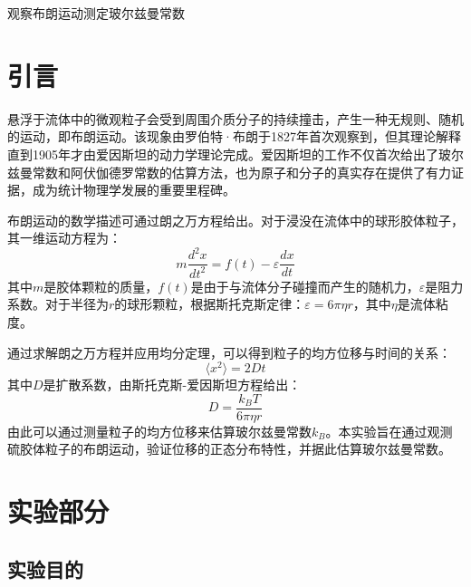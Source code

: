 \documentclass[a4paper]{article}
\newcommand{\zihaoSan}{\fontsize{16pt}{24pt}\selectfont}
\newcommand{\zihaoWu}{\fontsize{10.5pt}{16pt}\selectfont}
\begin{document}
\zihaoWu

\begin{center}
	{\zihaoSan\heiti 观察布朗运动测定玻尔兹曼常数}
\end{center}

\vspace{6pt}

\section{引言}
\vspace{-0.5em}

悬浮于流体中的微观粒子会受到周围介质分子的持续撞击，产生一种无规则、随机的运动，即布朗运动。该现象由罗伯特·布朗于1827年首次观察到，但其理论解释直到1905年才由爱因斯坦的动力学理论完成。爱因斯坦的工作不仅首次给出了玻尔兹曼常数和阿伏伽德罗常数的估算方法，也为原子和分子的真实存在提供了有力证据，成为统计物理学发展的重要里程碑。

布朗运动的数学描述可通过朗之万方程给出。对于浸没在流体中的球形胶体粒子，其一维运动方程为：
\begin{equation}
	m\frac{d^2x}{dt^2} = f(t) - \varepsilon\frac{dx}{dt}
\end{equation}
其中$m$是胶体颗粒的质量，$f(t)$是由于与流体分子碰撞而产生的随机力，$\varepsilon$是阻力系数。对于半径为$r$的球形颗粒，根据斯托克斯定律：$\varepsilon = 6\pi\eta r$，其中$\eta$是流体粘度。

通过求解朗之万方程并应用均分定理，可以得到粒子的均方位移与时间的关系：
\begin{equation}
	\langle x^2 \rangle = 2Dt
\end{equation}
其中$D$是扩散系数，由斯托克斯-爱因斯坦方程给出：
\begin{equation}
	D = \frac{k_BT}{6\pi\eta r}
\end{equation}
由此可以通过测量粒子的均方位移来估算玻尔兹曼常数$k_B$。本实验旨在通过观测硫胶体粒子的布朗运动，验证位移的正态分布特性，并据此估算玻尔兹曼常数。

\section{实验部分}
\vspace{-0.5em}

\subsection{实验目的}
\end{document}
